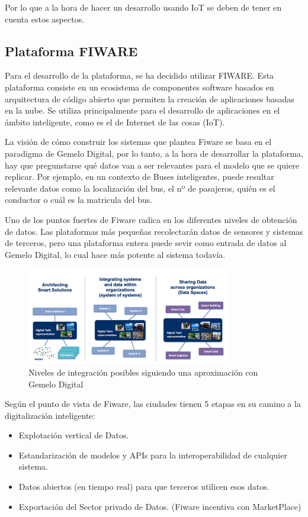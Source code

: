 \documentclass[12pt, a4paper, twoside]{article}
\begin{document}
Por lo que a la hora de hacer un desarrollo usando IoT se deben de tener en cuenta estos aspectos.


\subsection{Plataforma FIWARE} 
Para el desarrollo de la plataforma, se ha decidido utilizar FIWARE.
Esta plataforma consiste en un ecosistema de componentes software basados en arquitectura
de código abierto que permiten la creación de aplicaciones basadas en la nube. Se utiliza 
principalmente para el desarrollo de aplicaciones en el ámbito inteligente, como es el de 
Internet de las cosas (IoT).

La visión de cómo construir los sistemas que plantea Fiware se basa en el paradigma de Gemelo Digital,
por lo tanto, a la hora de desarrollar la plataforma, hay que pregunstarse qué datos van a 
ser relevantes para el modelo que se quiere replicar. Por ejemplo, en un contexto de 
Buses inteligentes, puede resultar relevante datos como la localización del bus, 
el nº de pasajeros, quién es el conductor o cuál es la matricula del bus.

Uno de los puntos fuertes de Fiware radica en los diferentes niveles de obtención de datos.
Las plataformas más pequeñas recolectarán datos de sensores y sistemas de terceros,
pero una plataforma entera puede sevir como entrada de datos al Gemelo Digital, lo
cual hace más potente al sistema todavía.

\begin{figure}[h]
  \centering
  \includegraphics[width=0.8\textwidth]{digital_twin_levels_integration.png}
  \caption{Niveles de integración posibles siguiendo una aproximación con Gemelo Digital}
\end{figure}

Según el punto de vista de Fiware, las ciudades tienen 5 etapas en su camino a la digitalización inteligente:
\begin{itemize}
  \item Explotación vertical de Datos.
  \item Estandarización de modelos y APIs para la interoperabilidad de cualquier sistema.
  \item Datos abiertos (en tiempo real) para que terceros utilicen esos datos.
  \item Exportación del Sector privado de Datos. (Fiware incentiva con MarketPlace)
\end{itemize}
\end{document}
